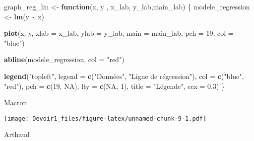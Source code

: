 \documentclass[
]{article}
\newenvironment{Shaded}{\begin{snugshade}}{\end{snugshade}}
\newcommand{\AttributeTok}[1]{\textcolor[rgb]{0.13,0.29,0.53}{#1}}
\newcommand{\ConstantTok}[1]{\textcolor[rgb]{0.56,0.35,0.01}{#1}}
\newcommand{\ControlFlowTok}[1]{\textcolor[rgb]{0.13,0.29,0.53}{\textbf{#1}}}
\newcommand{\DecValTok}[1]{\textcolor[rgb]{0.00,0.00,0.81}{#1}}
\newcommand{\FloatTok}[1]{\textcolor[rgb]{0.00,0.00,0.81}{#1}}
\newcommand{\FunctionTok}[1]{\textcolor[rgb]{0.13,0.29,0.53}{\textbf{#1}}}
\newcommand{\NormalTok}[1]{#1}
\newcommand{\OtherTok}[1]{\textcolor[rgb]{0.56,0.35,0.01}{#1}}
\newcommand{\SpecialCharTok}[1]{\textcolor[rgb]{0.81,0.36,0.00}{\textbf{#1}}}
\newcommand{\StringTok}[1]{\textcolor[rgb]{0.31,0.60,0.02}{#1}}
\begin{document}
\begin{Shaded}
\begin{Highlighting}[]
\NormalTok{graph\_reg\_lin }\OtherTok{\textless{}{-}} \ControlFlowTok{function}\NormalTok{(x, y , x\_lab, y\_lab,main\_lab) \{}
\NormalTok{  modele\_regression }\OtherTok{\textless{}{-}} \FunctionTok{lm}\NormalTok{(y }\SpecialCharTok{\textasciitilde{}}\NormalTok{ x)}
  
  \FunctionTok{plot}\NormalTok{(x, y, }
       \AttributeTok{xlab =}\NormalTok{ x\_lab, }
       \AttributeTok{ylab =}\NormalTok{ y\_lab, }
       \AttributeTok{main =}\NormalTok{ main\_lab,}
       \AttributeTok{pch =} \DecValTok{19}\NormalTok{, }\AttributeTok{col =} \StringTok{"blue"}\NormalTok{)}
  
  \FunctionTok{abline}\NormalTok{(modele\_regression, }\AttributeTok{col =} \StringTok{"red"}\NormalTok{)}
  
  \FunctionTok{legend}\NormalTok{(}\StringTok{"topleft"}\NormalTok{, }\AttributeTok{legend =} \FunctionTok{c}\NormalTok{(}\StringTok{"Données"}\NormalTok{, }\StringTok{"Ligne de régression"}\NormalTok{),}
         \AttributeTok{col =} \FunctionTok{c}\NormalTok{(}\StringTok{"blue"}\NormalTok{, }\StringTok{"red"}\NormalTok{), }\AttributeTok{pch =} \FunctionTok{c}\NormalTok{(}\DecValTok{19}\NormalTok{, }\ConstantTok{NA}\NormalTok{), }\AttributeTok{lty =} \FunctionTok{c}\NormalTok{(}\ConstantTok{NA}\NormalTok{, }\DecValTok{1}\NormalTok{),}
         \AttributeTok{title =} \StringTok{"Légende"}\NormalTok{, }\AttributeTok{cex =} \FloatTok{0.3}\NormalTok{)}
\NormalTok{\}}
\end{Highlighting}
\end{Shaded}

Macron

\begin{Shaded}
\end{Shaded}

\texttt{[image: Devoir1\_files/figure-latex/unnamed-chunk-9-1.pdf]}

Arthaud
\end{document}
